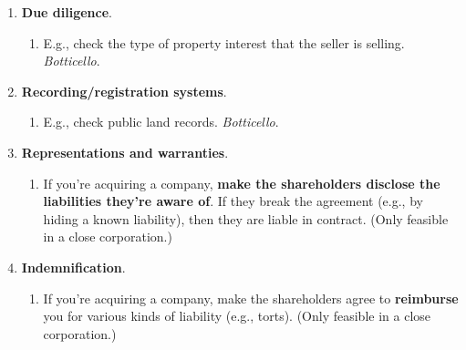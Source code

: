 \begin{enumerate}
\begin{enumerate}
    \end{enumerate}
    \item \textbf{Due diligence}.
    \begin{enumerate}
        \item E.g., check the type of property interest that the seller is 
        selling.  \emph{Botticello}.
    \end{enumerate}
    \item \textbf{Recording/registration systems}.
    \begin{enumerate}
        \item E.g., check public land records. \emph{Botticello}.
    \end{enumerate}
    \item \textbf{Representations and warranties}.
    \begin{enumerate}
        \item If you're acquiring a company, \textbf{make the shareholders 
        disclose the liabilities they're aware of}. If they break the 
        agreement (e.g., by hiding a known liability), then they are liable in 
        contract. (Only feasible in a close corporation.)
    \end{enumerate}
    \item \textbf{Indemnification}.
    \begin{enumerate}
        \item If you're acquiring a company, make the shareholders agree to 
        \textbf{reimburse} you for various kinds of liability (e.g., torts). 
        (Only feasible in a close corporation.)
    \end{enumerate}
\end{enumerate}
